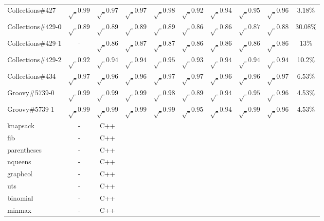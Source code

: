 \begin{table}[h!]
\begin{tabular}{lccccccccc}
    Collections\#427     & $\surd_{0.99}$  & $\surd_{0.97}$ & $\surd_{0.97}$ & $\surd_{0.98}$ & $\surd_{0.92}$ & $\surd_{0.94}$ & $\surd_{0.95}$ & $\surd_{0.96}$ & 3.18\% \\
    Collections\#429-0   & $\surd_{0.89}$  & $\surd_{0.89}$ & $\surd_{0.89}$ & $\surd_{0.89}$ & $\surd_{0.86}$ & $\surd_{0.86}$ &$\surd_{0.87}$ & $\surd_{0.88}$ & 30.08\% \\
    Collections\#429-1    & -  & $\surd_{0.86}$ &$\surd_{0.87}$ &$\surd_{0.87}$ & $\surd_{0.86}$ & $\surd_{0.86}$ & $\surd_{0.86}$ & $\surd_{0.86}$ & 13\% \\
    Collections\#429-2    & $\surd_{0.92}$  & $\surd_{0.94}$ & $\surd_{0.94}$ & $\surd_{0.95}$ & $\surd_{0.93}$ & $\surd_{0.94}$ & $\surd_{0.94}$ & $\surd_{0.94}$ & 10.2\% \\
    Collections\#434    & $\surd_{0.97}$  & $\surd_{0.96}$ & $\surd_{0.96}$ & $\surd_{0.97}$ & $\surd_{0.97}$ & $\surd_{0.96}$ & $\surd_{0.96}$ & $\surd_{0.97}$ & 6.53\% \\
    \midrule
    Groovy\#5739-0       & $\surd_{0.99}$  & $\surd_{0.99}$ & $\surd_{0.99}$ & $\surd_{0.98}$ & $\surd_{0.89}$ & $\surd_{0.94}$ & $\surd_{0.95}$ & $\surd_{0.96}$ & 4.53\% \\
    Groovy\#5739-1      & $\surd_{0.99}$  & $\surd_{0.99}$ & $\surd_{0.99}$ & $\surd_{0.99}$ & $\surd_{0.95}$ & $\surd_{0.94}$ & $\surd_{0.99}$ & $\surd_{0.96}$ & 4.53\% \\
    \midrule
    \midrule
    knapsack      &  -  & C++  &  &              &    &                                 &                   &                           &                              \\
    fib      &  - & C++  &  &              &    &                                 &                   &                           &                                \\
    parentheses      & -   & C++  &  &              &    &                                 &                   &                           &                                \\
    nqueens      &  -  & C++  &  &              &    &                                 &                   &                           &                                \\
    graphcol      &  -  & C++  &  &              &    &                                 &                   &                           &                              \\
    uts      &  -  & C++  &  &              &    &                                 &                   &                           &                               \\
    binomial      &  -  & C++  &  &              &    &                                 &                   &                           &                                \\
    minmax      &  -  & C++  &  &              &    &                                 &                   &                           &                               \\



\end{tabular}
\end{table}
